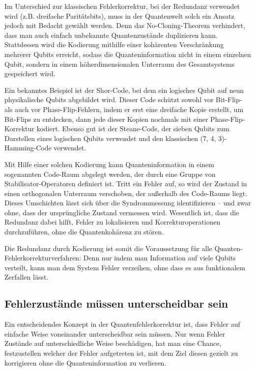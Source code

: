 Im Unterschied zur klassischen Fehlerkorrektur, bei der Redundanz verwendet wird (z.B. dreifache Paritätsbits), muss in der Quantenwelt solch ein Ansatz jedoch mit Bedacht gewählt werden. Denn das No-Cloning-Theorem verhindert, dass man auch einfach unbekannte Quantenzustände duplizieren kann. \cite{nielsen_michael_a_and_isaac_l_chuang_quantum_2010} Stattdessen wird die Kodierung mithilfe einer kohärenten Verschränkung mehrerer Qubits erreicht, sodass die Quanteninformation nicht in einem einzelnen Qubit, sondern in einem höherdimensionalen Unterraum des Gesamtsystems gespeichert wird.

Ein bekanntes Beispiel ist der Shor-Code, bei dem ein logisches Qubit auf neun physikalische Qubits abgebildet wird. Dieser Code schützt sowohl vor Bit-Flip- als auch vor Phase-Flip-Fehlern, indem er erst eine dreifache Kopie erstellt, um Bit-Flips zu entdecken, dann jede dieser Kopien nochmals mit einer Phase-Flip-Korrektur kodiert. \cite{shor_scheme_1995}
Ebenso gut ist der Steane-Code, der sieben Qubits zum Darstellen eines logischen Qubits verwendet und den klassischen (7, 4, 3)-Hamming-Code verwendet. \cite{Steane}

Mit Hilfe einer solchen Kodierung kann Quanteninformation in einem sogenannten Code-Raum abgelegt werden, der durch eine Gruppe von Stabilisator-Operatoren definiert ist. Tritt ein Fehler auf, so wird der Zustand in einen orthogonalen Unterraum verschoben, der außerhalb des Code-Raums liegt. Dieses Umschichten lässt sich über die Syndrommessung identifizieren – und zwar ohne, dass der ursprüngliche Zustand vermessen wird. Wesentlich ist, dass die Redundanz dabei hilft, Fehler zu lokalisieren und Korrekturoperationen durchzuführen, ohne die Quantenkohärenz zu stören.

Die Redundanz durch Kodierung ist somit die Voraussetzung für alle Quanten-Fehlerkorrekturverfahren: Denn nur indem man Information auf viele Qubits verteilt, kann man dem System Fehler \(\)verzeihen, ohne dass es aus funktionalem Zerfallen lässt.

\subsection{Fehlerzustände müssen unterscheidbar sein}
Ein entscheidendes Konzept in der Quantenfehlerkorrektur ist, dass Fehler auf einfache Weise voneinander unterscheidbar sein müssen. Nur wenn Fehler Zustände auf unterschiedliche Weise beschädigen, hat man eine Chance, festzustellen welcher der Fehler aufgetreten ist, mit dem Ziel diesen gezielt zu korrigieren ohne die Quanteninformation zu verlieren.

